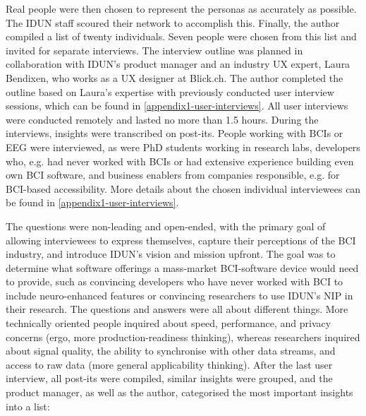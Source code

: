 Real people were then chosen to represent the personas as accurately as possible. The IDUN staff scoured their network to accomplish this. Finally, the author compiled a list of twenty individuals. Seven people were chosen from this list and invited for separate interviews. The interview outline was planned in collaboration with IDUN's product manager and an industry UX expert, Laura Bendixen, who works as a UX designer at Blick.ch. The author completed the outline based on Laura's expertise with previously conducted user interview sessions, which can be found in \autoref{appendix1-user-interviews}. All user interviews were conducted remotely and lasted no more than 1.5 hours. During the interviews, insights were transcribed on post-its. People working with BCIs or EEG were interviewed, as were PhD students working in research labs, developers who, e.g. had never worked with BCIs or had extensive experience building even own BCI software, and business enablers from companies responsible, e.g. for BCI-based accessibility. More details about the chosen individual interviewees can be found in \autoref{appendix1-user-interviews}.

The questions were non-leading and open-ended, with the primary goal of allowing interviewees to express themselves, capture their perceptions of the BCI industry, and introduce IDUN's vision and mission upfront. The goal was to determine what software offerings a mass-market BCI-software device would need to provide, such as convincing developers who have never worked with BCI to include neuro-enhanced features or convincing researchers to use IDUN's NIP in their research. The questions and answers were all about different things. More technically oriented people inquired about speed, performance, and privacy concerns (ergo, more production-readiness thinking), whereas researchers inquired about signal quality, the ability to synchronise with other data streams, and access to raw data (more general applicability thinking). After the last user interview, all post-its were compiled, similar insights were grouped, and the product manager, as well as the author, categorised the most important insights into a list:

